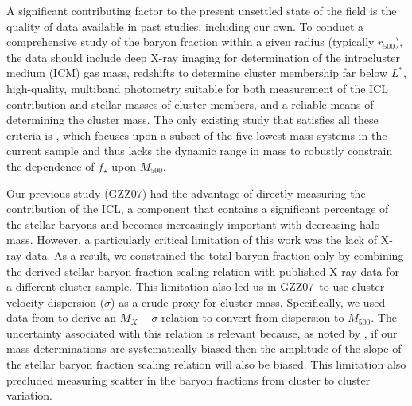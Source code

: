\documentclass[preprint]{emulateapj}
\newcommand\rfive{$r_{500}$}
\newcommand\ptwo{GZZ07}
\newcommand\mfive{${M}_{500}$}
\begin{document}
A significant contributing factor to the present unsettled state of
the field is the quality of data available in past studies, including
our own. To conduct a comprehensive study of the baryon fraction
within a given radius (typically \rfive), the data should include deep
X-ray imaging for determination of the intracluster medium (ICM) gas
mass, redshifts to determine cluster membership far below $L^*$,
high-quality, multiband photometry suitable for both measurement of
the ICL contribution and stellar masses of cluster members, and a
reliable means of determining the cluster mass.  The only existing
study that satisfies all these criteria is \citet{sanderson2013},
which focuses upon a subset of the five lowest mass systems in the
current sample and thus lacks the dynamic range in mass to robustly
constrain the dependence of $f_\star$ upon \mfive.


Our previous study (\ptwo) had the advantage of directly measuring the
contribution of the ICL, a component that contains a significant
percentage of the stellar baryons and becomes increasingly important
with decreasing halo mass. However, a particularly critical limitation
of this work was the lack of X-ray data.  As a result, we constrained
the total baryon fraction only by combining the derived stellar baryon
fraction scaling relation with published X-ray data for a different
cluster sample. This limitation also led us in \ptwo\ to use cluster
velocity dispersion ($\sigma$) as a crude proxy for cluster mass.
Specifically, we used data from \citet{vikhlinin2006} to derive an
$M_X-\sigma$ relation to convert from dispersion to \mfive. The
uncertainty associated with this relation is relevant because, as
noted by \citet{balogh2008}, if our mass determinations are
systematically biased then the amplitude of the slope of the stellar
baryon fraction scaling relation will also be biased. This limitation
also precluded measuring scatter in the baryon fractions from cluster
to cluster variation.
\end{document}
